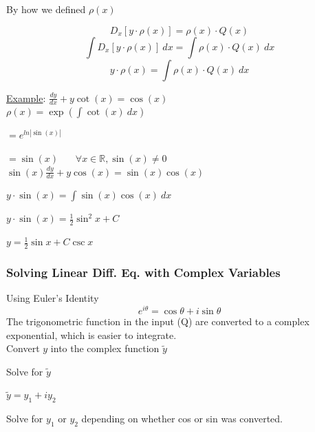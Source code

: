 \documentclass[12pt]{article}
\numberwithin{equation}{subsection}
\newcommand{\sinp}[1]{\sin\left( #1 \right)}
\newcommand{\cosp}[1]{\cos\left( #1 \right)}
\newcommand{\cotp}[1]{\cot\left( #1 \right)}
\newcommand{\absp}[1]{\left\vert #1 \right\vert}
\newcommand{\deryx}{\frac{dy}{dx}}
\newcommand{\indb}{\hspace{1cm}}
\newcommand{\indd}{\hspace{2cm}}
\newcommand{\indf}{\hspace{3cm}}
\DeclareMathOperator{\expo}{exp}
\newcommand{\expop}[1]{\expo \left( #1 \right)}
\begin{document}
By how we defined $\rho (x)$
 
\begin{equation}
D_{x}[y \cdot \rho (x)]= \rho (x) \cdot Q(x)
\end{equation}
\begin{equation}
\int D_{x}[y \cdot \rho (x)]\  dx= \int \rho (x) \cdot Q(x)\ dx
\end{equation}
\begin{equation}
y \cdot \rho (x)=\int \rho (x) \cdot Q(x)\ dx
\end{equation}

\bigskip




\noindent \underline{Example}: \hspace{1cm}$\displaystyle \deryx + y \cotp{x}= \cosp{x}$\\

\indb $\displaystyle \rho (x) = \expop{\int \cotp{x}\ dx}$

\indd $ =e^{\displaystyle ln \absp{\sinp{x}}}$

\indd $= \sinp{x}\ \ \ \ \ \ \ \  \forall x \in \mathbb{R},\sinp{x} \neq 0$\\

\indb $\sinp{x} \displaystyle \deryx + y\cosp{x}= \sinp{x} \cosp{x}$

\indf $\displaystyle y \cdot \sinp{x}= \int \sinp{x} \cosp{x}\ dx$

\indf $\displaystyle y \cdot \sinp{x}= \frac{1}{2}\sin^2 x +C$

\indf $\displaystyle y = \frac{1}{2}\sin x +C\csc x$

\subsubsection{Solving Linear Diff. Eq. with Complex Variables}

Using Euler's Identity
\begin{equation}
e^{i \theta} = \cos \theta + i\sin \theta
\end{equation} 
\noindent The trigonometric function in the input (Q) are converted to a complex exponential, which is easier to integrate.\\

\indb Convert $y$ into the complex function $\widetilde{y}$

\indb Solve for $\widetilde{y}$

\indb $\widetilde{y} = y_1 + i y_2$

\indd Solve for $y_1$ or $y_2$ depending on whether cos or sin was converted.
\end{document}
